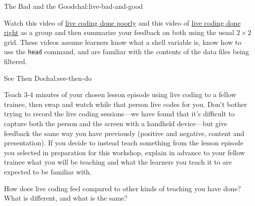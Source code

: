 \begin{challenge}{The Bad and the Good}{chal:live-bad-and-good}

Watch this video of
\href{https://youtu.be/bXxBeNkKmJE}{live coding done poorly}
and this video of
\href{https://youtu.be/SkPmwe\_WjeY}{live coding done right}
as a group and then summarize your feedback on both using the usual
$2{\times}2$ grid.  These videos assume learners know what a shell
variable is, know how to use the \texttt{head} command, and are
familiar with the contents of the data files being filtered.

\end{challenge}

\begin{challenge}{See Then Do}{chal:see-then-do}

Teach 3-4 minutes of your chosen lesson episode using live coding to a
fellow trainee, then swap and watch while that person live codes for
you. Don't bother trying to record the live coding sessions---we have
found that it's difficult to capture both the person and the screen
with a handheld device---but give feedback the same way you have
previously (positive and negative, content and presentation). If you
decide to instead teach something from the lesson episode you selected
in preparation for this workshop, explain in advance to your fellow
trainee what you will be teaching and what the learners you teach it
to are expected to be familiar with.

How does live coding feel compared to other kinds of teaching you have
done?  What is different, and what is the same?

\end{challenge}
